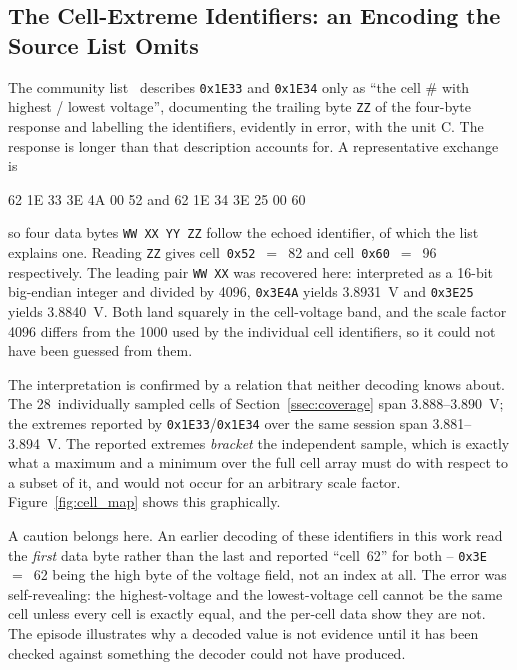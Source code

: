 \documentclass[11pt,a4paper,oneside,parskip=half]{scrreprt}
\providecommand{\hex}{}\renewcommand{\hex}[1]{\texttt{0x#1}}
\begin{document}
\subsection{The Cell-Extreme Identifiers: an Encoding the Source List Omits}
\label{ssec:cellextremes}
The community list~\cite{vwmebpidlist} describes \hex{1E33} and \hex{1E34} only as ``the cell \# with highest / lowest voltage'', documenting the trailing byte \texttt{ZZ} of the four-byte response and labelling the identifiers, evidently in error, with the unit \textdegree C. The response is longer than that description accounts for. A representative exchange is

\begin{center}
 62 1E 33 3E 4A 00 52 \qquad and  62 1E 34 3E 25 00 60
\end{center}

\noindent so four data bytes \texttt{WW XX YY ZZ} follow the echoed identifier, of which the list explains one. Reading \texttt{ZZ} gives cell~\hex{52}~$=$~82 and cell~\hex{60}~$=$~96 respectively. The leading pair \texttt{WW XX} was recovered here: interpreted as a 16-bit big-endian integer and divided by 4096, \hex{3E4A} yields 3.8931~V and \hex{3E25} yields 3.8840~V. Both land squarely in the cell-voltage band, and the scale factor 4096 differs from the 1000 used by the individual cell identifiers, so it could not have been guessed from them.

The interpretation is confirmed by a relation that neither decoding knows about. The 28~individually sampled cells of Section~\ref{ssec:coverage} span 3.888--3.890~V; the extremes reported by \hex{1E33}/\hex{1E34} over the same session span 3.881--3.894~V. The reported extremes \emph{bracket} the independent sample, which is exactly what a maximum and a minimum over the full cell array must do with respect to a subset of it, and would not occur for an arbitrary scale factor. Figure~\ref{fig:cell_map} shows this graphically.

A caution belongs here. An earlier decoding of these identifiers in this work read the \emph{first} data byte rather than the last and reported ``cell~62'' for both -- \hex{3E}~$=$~62 being the high byte of the voltage field, not an index at all. The error was self-revealing: the highest-voltage and the lowest-voltage cell cannot be the same cell unless every cell is exactly equal, and the per-cell data show they are not. The episode illustrates why a decoded value is not evidence until it has been checked against something the decoder could not have produced.
\end{document}
